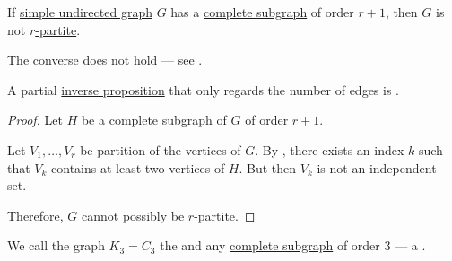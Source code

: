 \begin{proposition}\label{thm:multipartite_graph_complete_subgraph}
  If \hyperref[def:undirected_graph]{simple undirected graph} \( G \) has a \hyperref[def:complete_subgraph]{complete subgraph} of order \( r + 1 \), then \( G \) is not \hyperref[def:multipartite_graph]{\( r \)-partite}.
\end{proposition}
\begin{comments}
  \item The converse does not hold --- see .

  \item A partial \hyperref[def:conditional_formula/inverse]{inverse proposition} that only regards the number of edges is .
\end{comments}
\begin{proof}
  Let \( H \) be a complete subgraph of \( G \) of order \( r + 1 \).

  Let \( V_1, \ldots, V_r \) be  partition of the vertices of \( G \). By , there exists an index \( k \) such that \( V_k \) contains at least two vertices of \( H \). But then \( V_k \) is not an independent set.

  Therefore, \( G \) cannot possibly be \( r \)-partite.
\end{proof}

\begin{definition}\label{def:triangle_graph}
  We call the graph \( K_3 = C_3 \) the  and any \hyperref[def:complete_subgraph]{complete subgraph} of order \( 3 \) --- a .
\end{definition}

